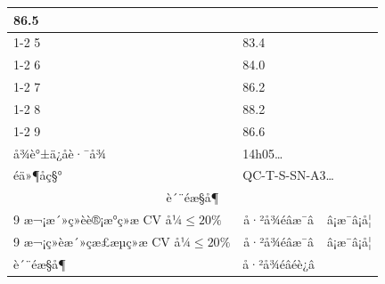 \documentclass[UTF8,10pt,a4paper,fontset=fandol]{ctexart}
\newcommand{\fieldvalue}[1]{#1}
\newcommand{\handwritten}[1]{#1}
\begin{document}
\begin{center}
\begin{center}
\begin{tabularx}{\textwidth}{|l|X|l|X|}
\fieldvalue{\handwritten{86.5}} & & \\
\cline{1-2}
5 &
\fieldvalue{\handwritten{83.4}} & & \\
\cline{1-2}
6 &
\fieldvalue{\handwritten{84.0}} & & \\
\cline{1-2}
7 &
\fieldvalue{\handwritten{86.2}} & & \\
\cline{1-2}
8 &
\fieldvalue{\handwritten{88.2}} & & \\
\cline{1-2}
9 &
\fieldvalue{\handwritten{86.6}} & & \\
\hline
\multicolumn{1}{|l|}{å¾è°±ä¿å­è·¯å¾} &
\multicolumn{3}{l|}{%
\fieldvalue{\handwritten{14h05\ldots}}} \\
\hline
\multicolumn{1}{|l|}{éä»¶åç§°} &
\multicolumn{3}{l|}{%
\fieldvalue{\handwritten{QC-T-S-SN-A3\ldots}}} \\
\hline
\multicolumn{4}{|c|}{è´¨éæ§å¶} \\
\hline
9 æ¬¡æ´»ç»èè®¡æ°ç»æ CV å¼$\leq20\%$ &
\multicolumn{1}{c|}{%
\fieldvalue{\handwritten{å·²å¾éâæ¯â}}} &
\multicolumn{2}{l|}{â¡æ¯\qquad â¡å¦} \\
\hline
9 æ¬¡ç»èæ´»çæ£æµç»æ CV å¼$\leq20\%$ &
\multicolumn{1}{c|}{%
\fieldvalue{\handwritten{å·²å¾éâæ¯â}}} &
\multicolumn{2}{l|}{â¡æ¯\qquad â¡å¦} \\
\hline
è´¨éæ§å¶ &
\multicolumn{1}{c|}{%
\fieldvalue{\handwritten{å·²å¾éâéè¿â}}} &

\end{tabularx}
\end{center}
\end{center}
\end{document}
